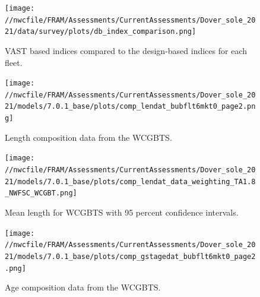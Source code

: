 \documentclass[11pt,
  english,
  a4paper,
]{article}
\begin{document}
\tagmcend\tagstructend


\begin{figure}
\centering
\texttt{[image: //nwcfile/FRAM/Assessments/CurrentAssessments/Dover\_sole\_2021/data/survey/plots/db\_index\_comparison.png]}
\caption{VAST based indices compared to the design-based indices for each fleet.\label{fig:db-vs-vast}}
\end{figure}

\tagmcend\tagstructend


\begin{figure}
\centering
\texttt{[image: //nwcfile/FRAM/Assessments/CurrentAssessments/Dover\_sole\_2021/models/7.0.1\_base/plots/comp\_lendat\_bubflt6mkt0\_page2.png]}
\caption{Length composition data from the WCGBTS.\label{fig:wcgbt-len-data}}
\end{figure}

\tagmcend\tagstructend


\begin{figure}
\centering
\texttt{[image: //nwcfile/FRAM/Assessments/CurrentAssessments/Dover\_sole\_2021/models/7.0.1\_base/plots/comp\_lendat\_data\_weighting\_TA1.8\_NWFSC\_WCGBT.png]}
\caption{Mean length for WCGBTS with 95 percent confidence intervals.\label{fig:mean-wcgbt-len-data}}
\end{figure}

\tagmcend\tagstructend


\begin{figure}
\centering
\texttt{[image: //nwcfile/FRAM/Assessments/CurrentAssessments/Dover\_sole\_2021/models/7.0.1\_base/plots/comp\_gstagedat\_bubflt6mkt0\_page2.png]}
\caption{Age composition data from the WCGBTS.\label{fig:wcgbt-age-data}}
\end{figure}

\tagmcend\tagstructend

\end{document}
